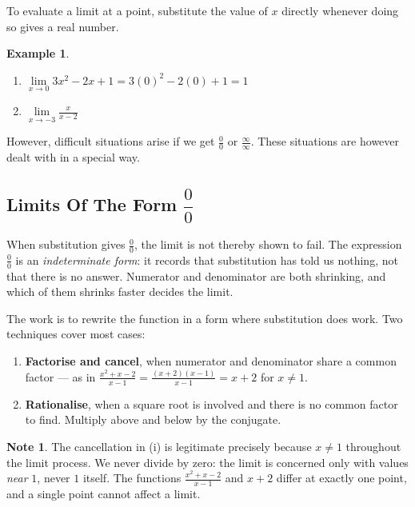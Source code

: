 \documentclass[11pt,a4paper]{article}
\theoremstyle{definition}
\newtheorem{example}[thm]{Example}
\newtheorem{note}[thm]{Note}
\begin{document}
To evaluate a limit at a point, substitute the value of $x$ directly whenever
doing so gives a real number.
\begin{example}

\begin{enumerate}
\item $\lim\limits_{x\longrightarrow 0} 3x^2-2x+1=3(0)^2-2(0)+1=1$
\item $\lim\limits_{x\longrightarrow -3}\frac{x}{x-2}$\\
\end{enumerate}

However, difficult situations arise if we get $\frac{0}{0}$ or $\frac{\infty}{\infty}$. These situations are however dealt with in a special way.
\end{example}
\subsection{Limits Of The Form $\dfrac{0}{0}$}
When substitution gives $\frac{0}{0}$, the limit is not thereby shown to fail. The
expression $\frac{0}{0}$ is an \emph{indeterminate form}: it records that
substitution has told us nothing, not that there is no answer. Numerator and
denominator are both shrinking, and which of them shrinks faster decides the limit.

The work is to rewrite the function in a form where substitution does work. Two
techniques cover most cases:
\begin{enumerate}
\item[(i).] \textbf{Factorise and cancel}, when numerator and denominator share a
common factor --- as in $\frac{x^{2}+x-2}{x-1}=\frac{(x+2)(x-1)}{x-1}=x+2$ for
$x\neq 1$.
\item[(ii).] \textbf{Rationalise}, when a square root is involved and there is no
common factor to find. Multiply above and below by the conjugate.
\end{enumerate}

\begin{note}
The cancellation in (i) is legitimate precisely because $x\neq 1$ throughout the
limit process. We never divide by zero: the limit is concerned only with values
\emph{near} $1$, never $1$ itself. The functions $\frac{x^{2}+x-2}{x-1}$ and $x+2$
differ at exactly one point, and a single point cannot affect a limit.
\end{note}
\end{document}
